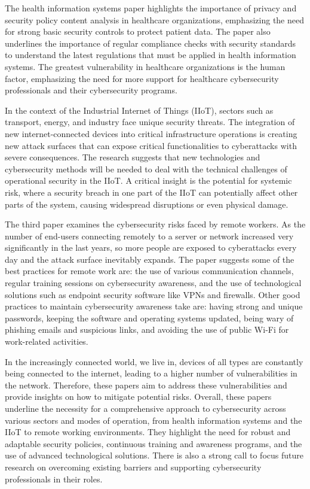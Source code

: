 \documentclass[journal]{IEEEtran}
\begin{document}
The health information systems paper highlights the importance of privacy and security policy content analysis in healthcare organizations, emphasizing the need for strong basic security controls to protect patient data. The paper also underlines the importance of regular compliance checks with security standards to understand the latest regulations that must be applied in health information systems. The greatest vulnerability in healthcare organizations is the human factor, emphasizing the need for more support for healthcare cybersecurity professionals and their cybersecurity programs.

In the context of the Industrial Internet of Things (IIoT), sectors such as transport, energy, and industry face unique security threats. The integration of new internet-connected devices into critical infrastructure operations is creating new attack surfaces that can expose critical functionalities to cyberattacks with severe consequences. The research suggests that new technologies and cybersecurity methods will be needed to deal with the technical challenges of operational security in the IIoT. A critical insight is the potential for systemic risk, where a security breach in one part of the IIoT can potentially affect other parts of the system, causing widespread disruptions or even physical damage.

The third paper examines the cybersecurity risks faced by remote workers. As the number of end-users connecting remotely to a server or network increased very significantly in the last years, so more people are exposed to cyberattacks every day and the attack surface inevitably expands. The paper suggests some of the best practices for remote work are: the use of various communication channels, regular training sessions on cybersecurity awareness, and the use of technological solutions such as endpoint security software like VPNs and firewalls. Other good practices to maintain cybersecurity awareness take are: having strong and unique passwords, keeping the software and operating systems updated, being wary of phishing emails and suspicious links, and avoiding the use of public Wi-Fi for work-related activities.

In the increasingly connected world, we live in, devices of all types are constantly being connected to the internet, leading to a higher number of vulnerabilities in the network. Therefore, these papers aim to address these vulnerabilities and provide insights on how to mitigate potential risks.
Overall, these papers underline the necessity for a comprehensive approach to cybersecurity across various sectors and modes of operation, from health information systems and the IIoT to remote working environments. They highlight the need for robust and adaptable security policies, continuous training and awareness programs, and the use of advanced technological solutions. There is also a strong call to focus future research on overcoming existing barriers and supporting cybersecurity professionals in their roles.
\end{document}
